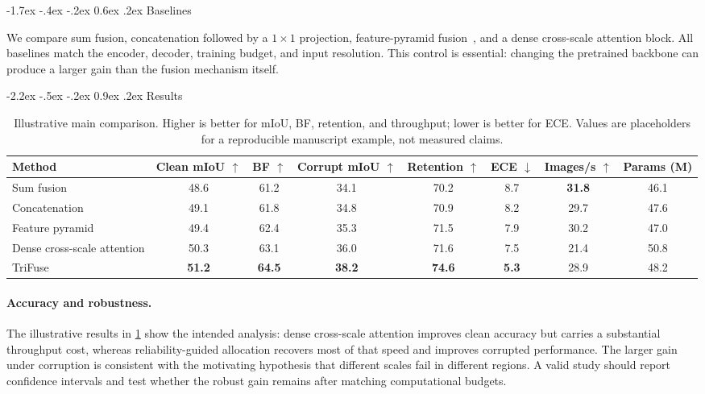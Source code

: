 \documentclass[10pt,twocolumn,letterpaper]{article}
\makeatletter
\newcommand{\method}{TriFuse}
\renewcommand\section{\@startsection{section}{1}{\z@}%
  {-2.2ex \@plus -.5ex \@minus -.2ex}%
  {0.9ex \@plus .2ex}%
  {\normalfont\large\bfseries\color{iccvblue}}}
\renewcommand\subsection{\@startsection{subsection}{2}{\z@}%
  {-1.7ex \@plus -.4ex \@minus -.2ex}%
  {0.6ex \@plus .2ex}%
  {\normalfont\normalsize\bfseries}}
\makeatother
\begin{document}
\subsection{Baselines}

We compare sum fusion, concatenation followed by a $1\times1$ projection,
feature-pyramid fusion~\cite{lin2017fpn}, and a dense cross-scale attention
block. All baselines match the encoder, decoder, training budget, and input
resolution. This control is essential: changing the pretrained backbone can
produce a larger gain than the fusion mechanism itself.

\section{Results}
\label{sec:results}

\begin{table}[t]
\centering
\caption{Illustrative main comparison. Higher is better for mIoU, BF,
retention, and throughput; lower is better for ECE. Values are placeholders for
a reproducible manuscript example, not measured claims.}
\label{tab:main}
\small
\begin{tabular}{lccccccc}
\toprule
Method & Clean mIoU $\uparrow$ & BF $\uparrow$ & Corrupt mIoU $\uparrow$ & Retention $\uparrow$ & ECE $\downarrow$ & Images/s $\uparrow$ & Params (M) \\
\midrule
Sum fusion                         & 48.6 & 61.2 & 34.1 & 70.2 & 8.7 & \textbf{31.8} & 46.1 \\
Concatenation                      & 49.1 & 61.8 & 34.8 & 70.9 & 8.2 & 29.7 & 47.6 \\
Feature pyramid~\cite{lin2017fpn} & 49.4 & 62.4 & 35.3 & 71.5 & 7.9 & 30.2 & 47.0 \\
Dense cross-scale attention        & 50.3 & 63.1 & 36.0 & 71.6 & 7.5 & 21.4 & 50.8 \\
\rowcolor{lightblue}
\method{}                          & \textbf{51.2} & \textbf{64.5} & \textbf{38.2} & \textbf{74.6} & \textbf{5.3} & 28.9 & 48.2 \\
\bottomrule
\end{tabular}
\end{table}

\paragraph{Accuracy and robustness.}
The illustrative results in \cref{tab:main} show the intended analysis: dense
cross-scale attention improves clean accuracy but carries a substantial
throughput cost, whereas reliability-guided allocation recovers most of that
speed and improves corrupted performance. The larger gain under corruption is
consistent with the motivating hypothesis that different scales fail in
different regions. A valid study should report confidence intervals and test
whether the robust gain remains after matching computational budgets.
\end{document}
